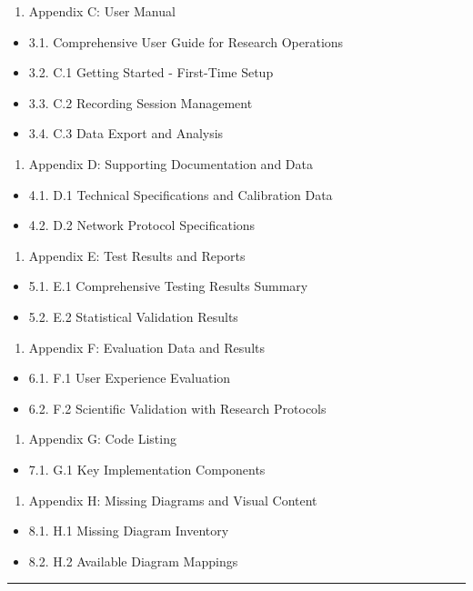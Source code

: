 \documentclass[12pt,a4paper]{article}
\begin{document}
\begin{enumerate}
\item Appendix C: User Manual
\end{enumerate}
\begin{itemize}
\item 3.1. Comprehensive User Guide for Research Operations
\item 3.2. C.1 Getting Started - First-Time Setup
\item 3.3. C.2 Recording Session Management
\item 3.4. C.3 Data Export and Analysis
\end{itemize}
\begin{enumerate}
\item Appendix D: Supporting Documentation and Data
\end{enumerate}
\begin{itemize}
\item 4.1. D.1 Technical Specifications and Calibration Data
\item 4.2. D.2 Network Protocol Specifications
\end{itemize}
\begin{enumerate}
\item Appendix E: Test Results and Reports
\end{enumerate}
\begin{itemize}
\item 5.1. E.1 Comprehensive Testing Results Summary
\item 5.2. E.2 Statistical Validation Results
\end{itemize}
\begin{enumerate}
\item Appendix F: Evaluation Data and Results
\end{enumerate}
\begin{itemize}
\item 6.1. F.1 User Experience Evaluation
\item 6.2. F.2 Scientific Validation with Research Protocols
\end{itemize}
\begin{enumerate}
\item Appendix G: Code Listing
\end{enumerate}
\begin{itemize}
\item 7.1. G.1 Key Implementation Components
\end{itemize}
\begin{enumerate}
\item Appendix H: Missing Diagrams and Visual Content
\end{enumerate}
\begin{itemize}
\item 8.1. H.1 Missing Diagram Inventory
\item 8.2. H.2 Available Diagram Mappings

\end{itemize}
\hrule
\end{document}
